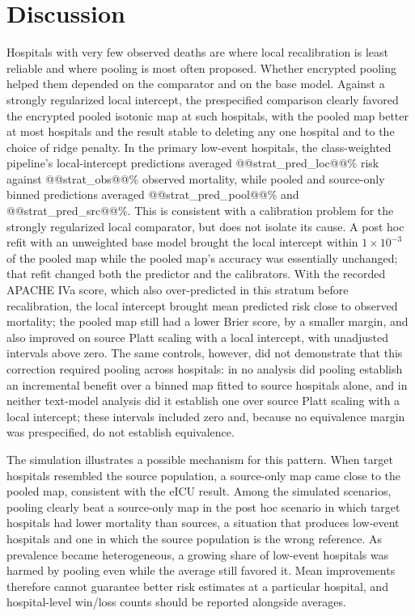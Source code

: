 \documentclass[11pt]{article}
\begin{document}
\section*{Discussion}
Hospitals with very few observed deaths are where local recalibration is least reliable and where pooling is most often proposed. Whether encrypted pooling helped them depended on the comparator and on the base model. Against a strongly regularized local intercept, the prespecified comparison clearly favored the encrypted pooled isotonic map at such hospitals, with the pooled map better at most hospitals and the result stable to deleting any one hospital and to the choice of ridge penalty. In the primary low-event hospitals, the class-weighted pipeline's local-intercept predictions averaged @@strat_pred_loc@@\% risk against @@strat_obs@@\% observed mortality, while pooled and source-only binned predictions averaged @@strat_pred_pool@@\% and @@strat_pred_src@@\%. This is consistent with a calibration problem for the strongly regularized local comparator, but does not isolate its cause. A post hoc refit with an unweighted base model brought the local intercept within $1\times10^{-3}$ of the pooled map while the pooled map's accuracy was essentially unchanged; that refit changed both the predictor and the calibrators. With the recorded APACHE IVa score, which also over-predicted in this stratum before recalibration, the local intercept brought mean predicted risk close to observed mortality; the pooled map still had a lower Brier score, by a smaller margin, and also improved on source Platt scaling with a local intercept, with unadjusted intervals above zero. The same controls, however, did not demonstrate that this correction required pooling across hospitals: in no analysis did pooling establish an incremental benefit over a binned map fitted to source hospitals alone, and in neither text-model analysis did it establish one over source Platt scaling with a local intercept; these intervals included zero and, because no equivalence margin was prespecified, do not establish equivalence.

The simulation illustrates a possible mechanism for this pattern. When target hospitals resembled the source population, a source-only map came close to the pooled map, consistent with the eICU result. Among the simulated scenarios, pooling clearly beat a source-only map in the post hoc scenario in which target hospitals had lower mortality than sources, a situation that produces low-event hospitals and one in which the source population is the wrong reference. As prevalence became heterogeneous, a growing share of low-event hospitals was harmed by pooling even while the average still favored it. Mean improvements therefore cannot guarantee better risk estimates at a particular hospital, and hospital-level win/loss counts should be reported alongside averages.
\end{document}
